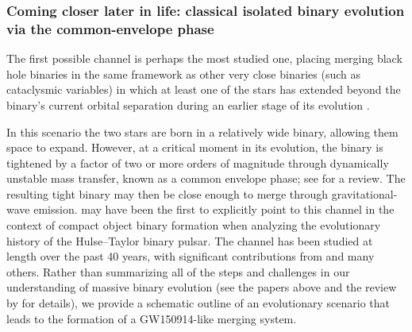 \documentclass[iop,onecolumn]{revtex4-1}
\begin{document}
\subsubsection{Coming closer later in life: classical isolated binary evolution via the common-envelope phase}
\label{form:isol}

The first possible channel is perhaps the most studied one, placing merging black hole binaries in the same framework as other very close binaries (such as cataclysmic variables) in which at least one of the stars has extended beyond the binary's current orbital separation during an earlier stage of its evolution \citep[e.g.,][]{Paczynski:1976}. 

In this scenario the two stars are born in a relatively wide binary, allowing them space to expand.  However, at a critical moment in its evolution, the binary is tightened by a factor of two or more orders of magnitude through dynamically unstable mass transfer, known as a common envelope phase; see \citet{Ivanova:2013} for a review. The resulting tight binary may then be close enough to merge through gravitational-wave emission.  \citet{SmarrBlandford:1976} may have been the first to explicitly point to this channel in the context of compact object binary formation when analyzing the evolutionary history of the Hulse--Taylor binary pulsar. The channel has been studied at length over the past 40 years, with significant contributions from \citet{TutukovYungelson:1993,Lipunov:1997,BetheBrown:1998,Nelemans:2003,VossTauris:2003,Pfahl:2005,Dewi:2006,Kalogera:2007,OShaughnessy:2008,Dominik:2012,Belczynski:2016,EldridgeStanway:2016} and many others. Rather than summarizing all of the steps and challenges in our understanding of massive binary evolution (see the papers above and the review by \citet{PostnovYungelson:2014} for details), we provide a schematic outline of an evolutionary scenario that leads to the formation of a GW150914-like merging system.
\end{document}

